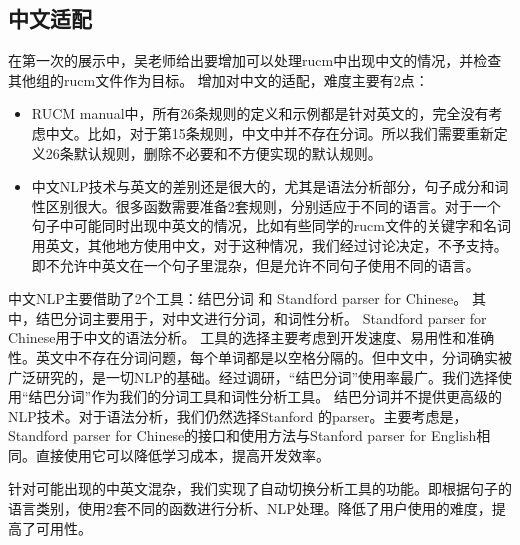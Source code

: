     \subsection{中文适配}

    在第一次的展示中，吴老师给出要增加可以处理rucm中出现中文的情况，并检查其他组的rucm文件作为目标。
    增加对中文的适配，难度主要有2点：
    
    \begin{itemize}
        \item RUCM manual中，所有26条规则的定义和示例都是针对英文的，完全没有考虑中文。比如，对于第15条规则，中文中并不存在分词。所以我们需要重新定义26条默认规则，删除不必要和不方便实现的默认规则。
        \item 中文NLP技术与英文的差别还是很大的，尤其是语法分析部分，句子成分和词性区别很大。很多函数需要准备2套规则，分别适应于不同的语言。对于一个句子中可能同时出现中英文的情况，比如有些同学的rucm文件的关键字和名词用英文，其他地方使用中文，对于这种情况，我们经过讨论决定，不予支持。即不允许中英文在一个句子里混杂，但是允许不同句子使用不同的语言。
    \end{itemize}

    中文NLP主要借助了2个工具：结巴分词 和 Standford parser for Chinese。
    其中，结巴分词主要用于，对中文进行分词，和词性分析。
    Standford parser for Chinese用于中文的语法分析。
    工具的选择主要考虑到开发速度、易用性和准确性。英文中不存在分词问题，每个单词都是以空格分隔的。但中文中，分词确实被广泛研究的，是一切NLP的基础。经过调研，“结巴分词”使用率最广。我们选择使用“结巴分词”作为我们的分词工具和词性分析工具。
    结巴分词并不提供更高级的NLP技术。对于语法分析，我们仍然选择Stanford 的parser。主要考虑是，Standford parser for Chinese的接口和使用方法与Stanford parser for English相同。直接使用它可以降低学习成本，提高开发效率。

    针对可能出现的中英文混杂，我们实现了自动切换分析工具的功能。即根据句子的语言类别，使用2套不同的函数进行分析、NLP处理。降低了用户使用的难度，提高了可用性。
    